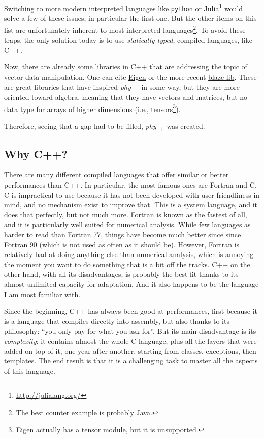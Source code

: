 \documentclass[12pt,a4paper]{report}
\newcommand{\phypp}{\textit{phy}$_{\text{++}}$\xspace}
\begin{document}
Switching to more modern interpreted languages like \texttt{python} or Julia\footnote{\url{http://julialang.org/}} would solve a few of these issues, in particular the first one. But the other items on this list are unfortunately inherent to most interpreted languages\footnote{The best counter example is probably Java.}. To avoid these traps, the only solution today is to use \emph{statically typed}, compiled languages, like C++.

Now, there are already some libraries in C++ that are addressing the topic of vector data manipulation. One can cite \href{http://eigen.tuxfamily.org}{Eigen} or the more recent \href{https://code.google.com/p/blaze-lib/}{blaze-lib}. These are great libraries that have inspired \phypp in some way, but they are more oriented toward algebra, meaning that they have vectors and matrices, but no data type for arrays of higher dimensions (i.e., tensors\footnote{Eigen actually has a tensor module, but it is unsupported.}).

Therefore, seeing that a gap had to be filled, \phypp was created.

\subsection{Why C++?}

There are many different compiled languages that offer similar or better performances than C++. In particular, the most famous ones are Fortran and C. C is impractical to use because it has not been developed with user-friendliness in mind, and no mechanism exist to improve that. This is a system language, and it does that perfectly, but not much more. Fortran is known as the fastest of all, and it is particularly well suited for numerical analysis. While few languages as harder to read than Fortran 77, things have become much better since since Fortran 90 (which is not used as often as it should be). However, Fortran is relatively bad at doing anything else than numerical analysis, which is annoying the moment you want to do something that is a bit off the tracks. C++ on the other hand, with all its disadvantages, is probably the best fit thanks to its almost unlimited capacity for adaptation. And it also happens to be the language I am most familiar with.

Since the beginning, C++ has always been good at performances, first because it is a language that compiles directly into assembly, but also thanks to its philosophy: ``you only pay for what you ask for''. But its main disadvantage is its \emph{complexity}: it contains almost the whole C language, plus all the layers that were added on top of it, one year after another, starting from classes, exceptions, then templates. The end result is that it is a challenging task to master all the aspects of this language.
\end{document}
